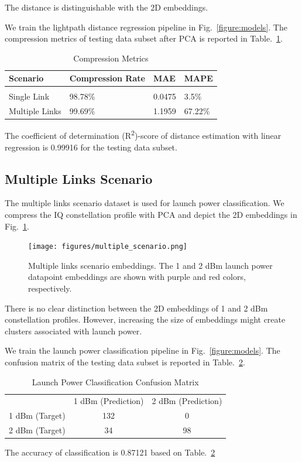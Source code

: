 \documentclass[lettersize,journal, one-column]{IEEEtran}
\begin{document}
The distance is distinguishable with the 2D embeddings.

We train the lightpath distance regression pipeline in Fig.~\ref{figure:models}.
The compression metrics of testing data subset after PCA is reported in Table.~\ref{table:compression}.
\begin{table}
    \centering
    \caption{Compression Metrics}
    \begin{tabular}{l l l l}
        \hline
        \hline
        Scenario & Compression Rate & MAE & MAPE \\
		\hline \\
        Single Link & 98.78\% & 0.0475 & 3.5\% \\
        Multiple Links & 99.69\% & 1.1959 & 67.22\% \\
        \hline
    \end{tabular}
    \label{table:compression}
\end{table}

The coefficient of determination (R\textsuperscript{2})-score of distance estimation with linear regression is 0.99916 for the testing data subset.

\subsection{Multiple Links Scenario}
The multiple links scenario dataset is used for launch power classification.
We compress the IQ constellation profile with PCA and depict the 2D embeddings in Fig.~\ref{figure:multiple_whole}.
\begin{figure}
	\centering
    \texttt{[image: figures/multiple\_scenario.png]}
    \caption{Multiple links scenario embeddings. The 1 and 2 dBm launch power datapoint embeddings are shown with purple and red colors, respectively.}
	\label{figure:multiple_whole}
\end{figure}
There is no clear distinction between the 2D embeddings of 1 and 2 dBm constellation profiles.
However, increasing the size of embeddings might create clusters associated with launch power.

We train the launch power classification pipeline in Fig.~\ref{figure:models}.
The confusion matrix of the testing data subset is reported in Table.~\ref{table:confusion_mat}.
\begin{table}
    \centering
    \caption{Launch Power Classification Confusion Matrix}
    \begin{tabular}{l l l}
        & 1 dBm (Prediction) & 2 dBm (Prediction) \\
        \cline{2-3}
        1 dBm (Target) & \multicolumn{1}{|c|}{132} & \multicolumn{1}{c|}{0} \\
        \cline{2-3}
        2 dBm (Target) & \multicolumn{1}{|c|}{34} & \multicolumn{1}{c|}{98} \\
        \cline{2-3}
    \end{tabular}
    \label{table:confusion_mat}
\end{table}
The accuracy of classification is 0.87121 based on Table.~\ref{table:confusion_mat}
\end{document}
